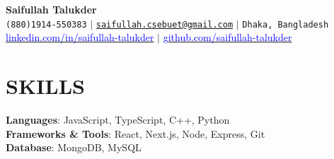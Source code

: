 \documentclass[letterpaper,10pt]{article}
\begin{document}
\begin{center}
    \textbf{\Huge Saifullah Talukder} \\ \vspace{5pt}
    \small \faPhone* \texttt{(880)1914-550383} \hspace{1pt} $|$
    \hspace{1pt} \faEnvelope \hspace{2pt} \texttt{\href{mailto:saifullah.cse16.buet@gmail.com}{saifullah.csebuet@gmail.com}} \hspace{1pt} $|$ 
    \hspace{1pt} \faMapMarker* \hspace{2pt}\texttt{Dhaka, Bangladesh}
    \\ \vspace{5pt}
    \hspace{1pt} \faLinkedin \hspace{2pt} \href{https://www.linkedin.com/in/saifullah-talukder}{\textcolor{blue}{linkedin.com/in/saifullah-talukder}} \hspace{1pt} $|$
    \hspace{1pt} \faGithub \hspace{2pt} \href{https://github.com/saifullah-talukder}{\textcolor{blue}{github.com/saifullah-talukder}} \hspace{1pt} %
    \\ \vspace{-5pt}
\end{center}

\section{SKILLS}
 \begin{itemize}[leftmargin=0in, label={}]
    \small{\item{
     \textbf{Languages}: \hspace{41pt} {JavaScript, TypeScript, C++, Python}\vspace{2pt} \\
     \textbf{Frameworks \& Tools}: \hspace{1pt} {React, Next.js, Node, Express, Git}\vspace{2pt} \\
     \textbf{Database}: \hspace{49pt} {MongoDB, MySQL}
    }}
 \end{itemize}
\end{document}
